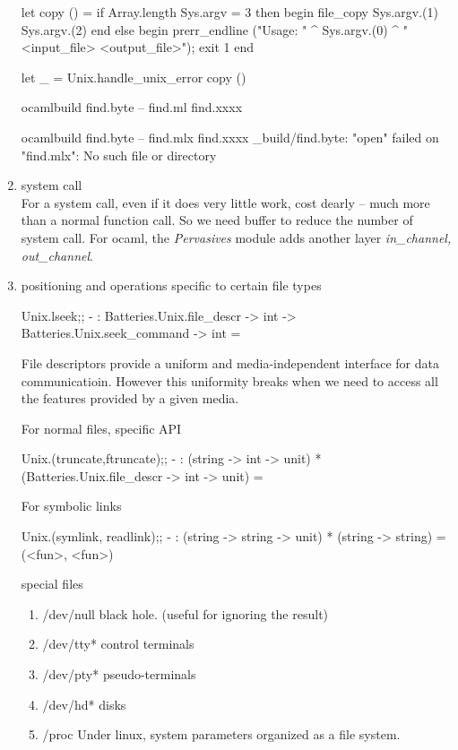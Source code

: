 \begin{enumerate}
\begin{ocamlcode}
let copy () = 
  if Array.length Sys.argv = 3 then begin 
    file_copy Sys.argv.(1) Sys.argv.(2)
  end 
  else begin 
    prerr_endline 
      ("Usage: " ^ Sys.argv.(0) ^ "<input_file> <output_file>"); 
    exit 1 
  end 

let _  = Unix.handle_unix_error copy () 
\end{ocamlcode}

\begin{bluetext}
ocamlbuild find.byte -- find.ml find.xxxx    
\end{bluetext}

\begin{alternate}
ocamlbuild find.byte -- find.mlx find.xxxx
_build/find.byte: "open" failed on "find.mlx": No such file or directory
\end{alternate}
\item  system call \\
  For a system call, even if it does very little work, cost dearly --
  much more than a normal function call. So we need buffer to reduce
  the number of system call. For ocaml, the \textit{Pervasives} module
  adds another layer \textit{in\_channel, out\_channel}.

\item positioning and operations specific to certain file types

  \begin{alternate}
Unix.lseek;;
- : Batteries.Unix.file_descr -> int -> Batteries.Unix.seek_command -> int =
\end{alternate}

  File descriptors provide a uniform and media-independent interface
  for data communicatioin. However this uniformity breaks when we need
  to access all the features provided by a given media.

  For normal files, specific API
  \begin{ocamlcode}
Unix.(truncate,ftruncate);;
- : (string -> int -> unit) * (Batteries.Unix.file_descr -> int -> unit) =
\end{ocamlcode}
For symbolic links
\begin{ocamlcode}
Unix.(symlink, readlink);;
- : (string -> string -> unit) * (string -> string) = (<fun>, <fun>)  
\end{ocamlcode}

special files
\begin{enumerate}
\item /dev/null  black hole. (useful for ignoring the result)
\item /dev/tty* control terminals
\item /dev/pty* pseudo-terminals
\item /dev/hd* disks
\item /proc Under linux, system parameters organized as a file system.
\end{enumerate}


\end{enumerate}
